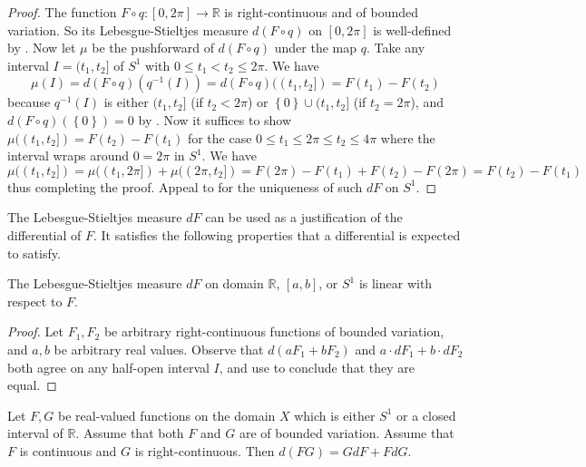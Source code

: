 \begin{proof}
The function \(F \circ q : [0, 2\pi] \to \mathbb{R}\) is right-continuous and of bounded variation. So its Lebesgue-Stieltjes measure \(d(F \circ q)\) on \([0, 2\pi]\) is well-defined by . Now let \(\mu\) be the pushforward of \(d(F \circ q)\) under the map \(q\). Take any interval \(I = (t_1, t_2]\) of \(S^1\) with \(0 \leq t_1 < t_2 \leq 2\pi\). We have
\[
\mu(I) = d(F \circ q)(q^{-1}(I)) = d(F \circ q)((t_1, t_2]) = F(t_1) - F(t_2)
\]
because \(q^{-1}(I)\) is either \((t_1, t_2]\) (if \(t_2 < 2\pi\)) or \(\left\{ 0 \right\} \cup (t_1, t_2]\) (if \(t_2 = 2\pi\)), and \(d(F \circ q)(\left\{ 0 \right\}) = 0\) by . Now it suffices to show \(\mu((t_1, t_2]) = F(t_2) - F(t_1)\) for the case \(0 \leq t_1 \leq 2\pi \leq t_2 \leq 4\pi\) where the interval wraps around \(0 = 2\pi\) in \(S^1\). We have
\[
\mu((t_1, t_2]) = \mu((t_1, 2\pi]) + \mu((2\pi, t_2]) = F(2\pi) - F(t_1) + F(t_2) - F(2\pi) = F(t_2) - F(t_1)
\]
thus completing the proof. Appeal to  for the uniqueness of such \(dF\) on \(S^1\).
\end{proof}

The Lebesgue-Stieltjes measure \(dF\) can be used as a justification of the differential of \(F\). It satisfies the following properties that a differential is expected to satisfy.

\begin{proposition}

The Lebesgue-Stieltjes measure \(dF\) on domain \(\mathbb{R}\), \([a, b]\), or \(S^1\) is linear with respect to \(F\).

\label{pro:lebesgue-stieltjes-linear}
\end{proposition}

\begin{proof}
Let \(F_1, F_2\) be arbitrary right-continuous functions of bounded variation, and \(a, b\) be arbitrary real values. Observe that \(d(aF_1 + bF_2)\) and \(a \cdot dF_1 + b \cdot dF_2\) both agree on any half-open interval \(I\), and use  to conclude that they are equal.
\end{proof}

\begin{proposition}

Let \(F, G\) be real-valued functions on the domain \(X\) which is either \(S^1\) or a closed interval of \(\mathbb{R}\). Assume that both \(F\) and \(G\) are of bounded variation. Assume that \(F\) is continuous and \(G\) is right-continuous. Then \(d(FG) = G dF + F dG\).

\label{pro:lebesgue-stieltjes-product}
\end{proposition}


